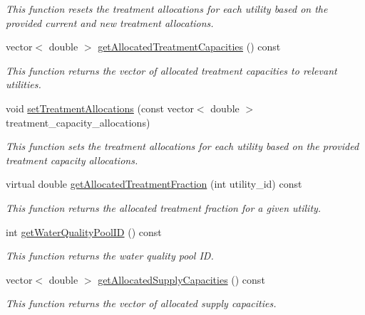 \begin{DoxyCompactItemize}
\begin{DoxyCompactList}\small\item\em This function resets the treatment allocations for each utility based on the provided current and new treatment allocations. \end{DoxyCompactList}\item 
vector$<$ double $>$ \mbox{\hyperlink{classWaterSource_a48df9ae09a8a7844beb18c35382adba1}{get\+Allocated\+Treatment\+Capacities}} () const
\begin{DoxyCompactList}\small\item\em This function returns the vector of allocated treatment capacities to relevant utilities. \end{DoxyCompactList}\item 
void \mbox{\hyperlink{classWaterSource_abc7034b8c78e45d7b1fa4bd13b8a3bdd}{set\+Treatment\+Allocations}} (const vector$<$ double $>$ treatment\+\_\+capacity\+\_\+allocations)
\begin{DoxyCompactList}\small\item\em This function sets the treatment allocations for each utility based on the provided treatment capacity allocations. \end{DoxyCompactList}\item 
virtual double \mbox{\hyperlink{classWaterSource_ad943083d8b3bee60ad8d106bba8a5faa}{get\+Allocated\+Treatment\+Fraction}} (int utility\+\_\+id) const
\begin{DoxyCompactList}\small\item\em This function returns the allocated treatment fraction for a given utility. \end{DoxyCompactList}\item 
int \mbox{\hyperlink{classWaterSource_a9d85cbca88eefd54fda383237807470d}{get\+Water\+Quality\+Pool\+ID}} () const
\begin{DoxyCompactList}\small\item\em This function returns the water quality pool ID. \end{DoxyCompactList}\item 
vector$<$ double $>$ \mbox{\hyperlink{classWaterSource_a4b05ca30a659ff351e75c487f31ff847}{get\+Allocated\+Supply\+Capacities}} () const
\begin{DoxyCompactList}\small\item\em This function returns the vector of allocated supply capacities. \end{DoxyCompactList}\end{DoxyCompactItemize}
